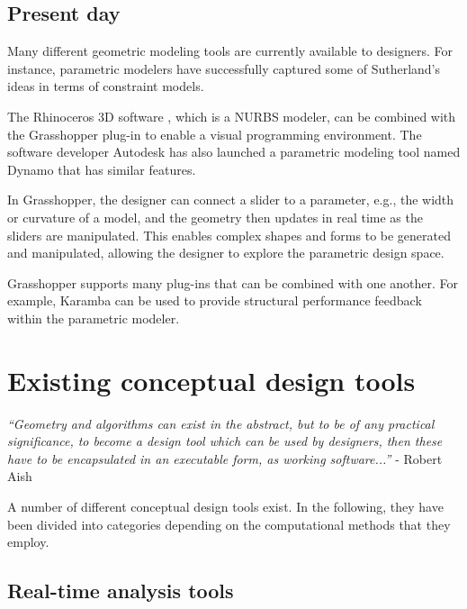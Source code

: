 \subsection{Present day}
Many different geometric modeling tools are currently available to designers. For instance, parametric modelers have successfully captured some of Sutherland’s ideas in terms of constraint models. 

The Rhinoceros 3D software \cite{Rhino}, which is a NURBS  modeler, can be combined with the Grasshopper plug-in \cite{Grasshopper} to enable a visual programming environment. The software developer Autodesk has also launched a parametric modeling tool named Dynamo \cite{Dynamo} that has similar features.


In Grasshopper, the designer can connect a slider to a parameter, e.g., the width or curvature of a model, and the geometry then updates in real time as the sliders are manipulated. This enables complex shapes and forms to be generated and manipulated, allowing the designer to explore the parametric design space. 

Grasshopper supports many plug-ins that can be combined with one another. For example, Karamba \cite{Karamba} can be used to provide structural performance feedback within the parametric modeler. 

\section{Existing conceptual design tools}

\textit{``Geometry and algorithms can exist in the abstract, but to be of any practical significance, to become a design tool which can be used by designers, then these have to be encapsulated in an executable form, as working software...''} - Robert Aish \cite{Shea2005}

A number of different conceptual design tools exist. In the following, they have been divided into categories depending on the computational methods that they employ.

\subsection{Real-time analysis tools}

